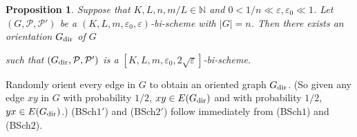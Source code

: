\documentclass{memo-l}
\newtheorem{prop}[firstthm]{Proposition}
\def\COMMENT#1{}
\def\proof{\removelastskip\penalty55\medskip\noindent{\bf Proof. }}
\def\eps{\varepsilon}
\def\epszero{\eps_0}
\numberwithin{section}{chapter}
\numberwithin{equation}{section}
\numberwithin{firstthm}{section}
\numberwithin{figure}{section}
\begin{document}
{\begin{prop}\label{lem:dirschemezz}
Suppose that $K, L, n, m/L \in \mathbb{N}$ and $0 <1/n  \ll \eps, \eps_0\ll 1$.
Let $(G,\mathcal{P}, \mathcal{P}')$ be a $(K, L, m, \epszero, \eps)$-bi-scheme with $|G| = n$.
Then there exists an orientation $G_{\rm dir}$ of $G$%
   \COMMENT{Daniela replaced $G-V_0$ by $G$ (also twice in the first para of the proof)}
such that $(G_{\rm dir}, \mathcal{P},\mathcal{P}')$ is a
$[K,L,m,\eps_0,2\sqrt{\eps}]$-bi-scheme.
\end{prop}
\proof 
Randomly orient every edge in $G$ to obtain an oriented graph $G_{\rm dir}$. (So given any edge $xy$ in $G$
with probability $1/2$, $xy \in E(G_{\rm dir})$ and with probability $1/2$, $yx \in E(G_{\rm dir})$.)
(BSch$1'$) and (BSch$2'$) follow immediately from (BSch$1$) and (BSch$2$).

}
\end{document}
